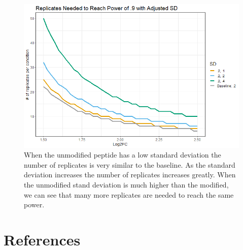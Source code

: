 \documentclass{mcp}
\begin{document}
\begin{figure}[h!]
\centering
\includegraphics[width=\textwidth]{sim_new/power_analysis_sd_combined}
\caption{When the unmodified peptide has a low standard deviation the number of replicates is very similar to the baseline. As the standard deviation increases the number of replicates increases greatly. When the unmodified stand deviation is much higher than the modified, we can see that many more replicates are needed to reach the same power.}
\label{fig:power_sd_combo}
\end{figure}






\clearpage
\section*{References}



\end{document}
